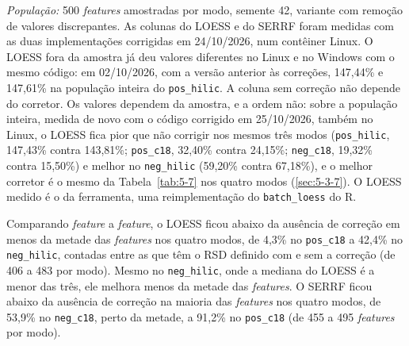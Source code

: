 \textit{População:} 500 \textit{features} amostradas por modo, semente 42, variante com remoção de valores discrepantes. As colunas do LOESS e do SERRF foram medidas com as duas implementações corrigidas em 24/10/2026, num contêiner Linux. O LOESS fora da amostra já deu valores diferentes no Linux e no Windows com o mesmo código: em 02/10/2026, com a versão anterior às correções, 147,44\% e 147,61\% na população inteira do \texttt{pos\_\allowbreak{}hilic}. A coluna sem correção não depende do corretor. Os valores dependem da amostra, e a ordem não: sobre a população inteira, medida de novo com o código corrigido em 25/10/2026, também no Linux, o LOESS fica pior que não corrigir nos mesmos três modos (\texttt{pos\_\allowbreak{}hilic}, 147,43\% contra 143,81\%; \texttt{pos\_\allowbreak{}c18}, 32,40\% contra 24,15\%; \texttt{neg\_\allowbreak{}c18}, 19,32\% contra 15,50\%) e melhor no \texttt{neg\_\allowbreak{}hilic} (59,20\% contra 67,18\%), e o melhor corretor é o mesmo da Tabela~\ref{tab:5-7} nos quatro modos (\ref{sec:5-3-7}). O LOESS medido é o da ferramenta, uma reimplementação do \texttt{batch\_\allowbreak{}loess} do R.


Comparando \textit{feature} a \textit{feature}, o LOESS ficou abaixo da ausência de correção em menos da metade das \textit{features} nos quatro modos, de 4,3\% no \texttt{pos\_\allowbreak{}c18} a 42,4\% no \texttt{neg\_\allowbreak{}hilic}, contadas entre as que têm o RSD definido com e sem a correção (de 406 a 483 por modo). Mesmo no \texttt{neg\_\allowbreak{}hilic}, onde a mediana do LOESS é a menor das três, ele melhora menos da metade das \textit{features}. O SERRF ficou abaixo da ausência de correção na maioria das \textit{features} nos quatro modos, de 53,9\% no \texttt{neg\_\allowbreak{}c18}, perto da metade, a 91,2\% no \texttt{pos\_\allowbreak{}c18} (de 455 a 495 \textit{features} por modo).

